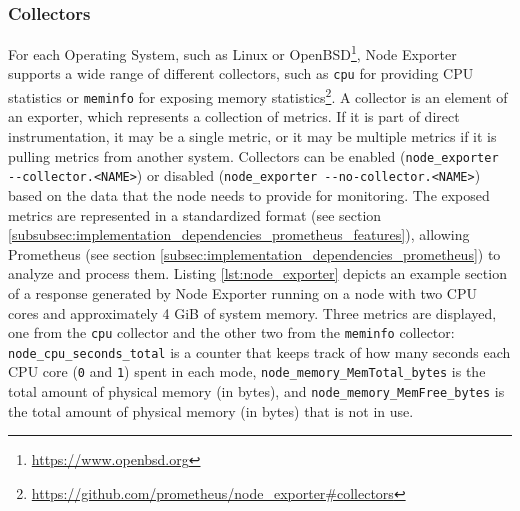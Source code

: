 \subsubsection{Collectors}
\label{subsubsec:implementation_dependencies_node_exporter-collectors}

For each Operating System, such as Linux or OpenBSD\footnote{\url{https://www.openbsd.org}},
Node Exporter supports a wide range of different collectors, such as \texttt{cpu}
for providing CPU statistics or \texttt{meminfo} for exposing memory statistics\footnote{\url{https://github.com/prometheus/node_exporter\#collectors}}.
A collector is an element of an exporter, which represents a collection of
metrics. If it is part of direct instrumentation, it may be a single metric, or it
may be multiple metrics if it is pulling metrics from another system\cite{prometheus_metrics}.
Collectors can be enabled (\lstinline[language=shell, basicstyle=\ttfamily,
alsoletter={_, -, ., <, >}, morekeywords={[2]{node_exporter}}, morekeywords={[3]{--collector.<NAME>}}]{node_exporter --collector.<NAME>})
or disabled (\lstinline[language=shell, basicstyle=\ttfamily, alsoletter={_, -, ., <, >},
morekeywords={[2]{node_exporter}}, morekeywords={[3]{--no-collector.<NAME>}}]{node_exporter --no-collector.<NAME>})
based on the data that the node needs to provide for monitoring. The exposed
metrics are represented in a standardized format (see section \ref{subsubsec:implementation_dependencies_prometheus_features}),
allowing Prometheus (see section
\ref{subsec:implementation_dependencies_prometheus}) to analyze and process them.
Listing \ref{lst:node_exporter} depicts an example section of a response
generated by Node Exporter running on a node with two CPU cores and
approximately 4 GiB of system memory. Three metrics are displayed, one from the
\texttt{cpu} collector and the other two from the \texttt{meminfo} collector: \texttt{node\_cpu\_seconds\_total}
is a counter that keeps track of how many seconds each CPU core (\texttt{0} and
\texttt{1}) spent in each mode, \texttt{node\_memory\_MemTotal\_bytes} is the
total amount of physical memory (in bytes), and \texttt{node\_memory\_MemFree\_bytes}
is the total amount of physical memory (in bytes) that is not in use.

